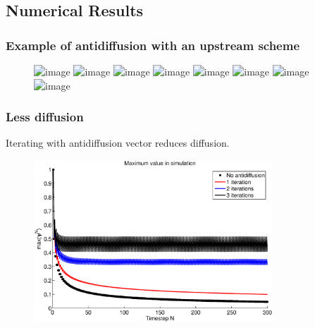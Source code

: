 \documentclass[hyperref={pdfstartview=Fit,pdfpagemode=FullScreen}]{beamer}
\newcommand{\imsize}{}
\begin{document}
\subsection{Numerical Results}

\begin{frame}
\frametitle{Example of antidiffusion with an upstream scheme}
\begin{figure}
\renewcommand{\imsize}{0.7\textwidth}
\includegraphics<1>[width=\imsize]{animation/aanime0}%
\includegraphics<2>[width=\imsize]{animation/aanime1}%
\includegraphics<3>[width=\imsize]{animation/aanime2}%
\includegraphics<4>[width=\imsize]{animation/aanime3}%
\includegraphics<5>[width=\imsize]{animation/aanime4}%
\includegraphics<6>[width=\imsize]{animation/aanime5}%
\includegraphics<7>[width=\imsize]{animation/aanime6}%
\includegraphics<8>[width=\imsize]{animation/aanime7}%
\end{figure}
\end{frame}

\begin{frame}

\frametitle{Less diffusion}
Iterating with antidiffusion vector reduces diffusion.

\begin{figure}
\renewcommand{\imsize}{0.8\textwidth}
\includegraphics[width=\imsize]{maxs}%
\end{figure}
\end{frame}
\end{document}
